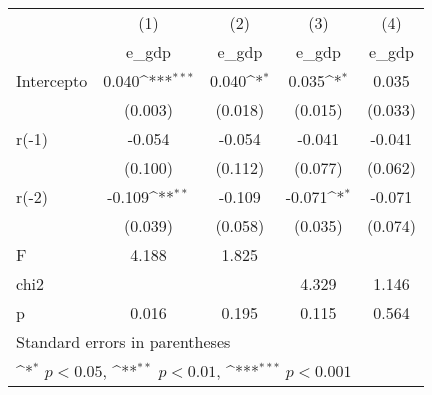 {
\def\sym#1{\ifmmode^{#1}\else\(^{#1}\)\fi}
\begin{longtable}{l*{4}{c}}
\hline\hline\endfirsthead\hline\endhead\hline\endfoot\endlastfoot
            &\multicolumn{1}{c}{(1)}&\multicolumn{1}{c}{(2)}&\multicolumn{1}{c}{(3)}&\multicolumn{1}{c}{(4)}\\
            &\multicolumn{1}{c}{e\_gdp}&\multicolumn{1}{c}{e\_gdp}&\multicolumn{1}{c}{e\_gdp}&\multicolumn{1}{c}{e\_gdp}\\
\hline
Intercepto  &       0.040\sym{***}&       0.040\sym{*}  &       0.035\sym{*}  &       0.035         \\
            &     (0.003)         &     (0.018)         &     (0.015)         &     (0.033)         \\
r(-1)       &      -0.054         &      -0.054         &      -0.041         &      -0.041         \\
            &     (0.100)         &     (0.112)         &     (0.077)         &     (0.062)         \\
r(-2)       &      -0.109\sym{**} &      -0.109         &      -0.071\sym{*}  &      -0.071         \\
            &     (0.039)         &     (0.058)         &     (0.035)         &     (0.074)         \\
\hline
F           &       4.188         &       1.825         &                     &                     \\
chi2        &                     &                     &       4.329         &       1.146         \\
p           &       0.016         &       0.195         &       0.115         &       0.564         \\
\hline\hline
\multicolumn{5}{l}{\footnotesize Standard errors in parentheses}\\
\multicolumn{5}{l}{\footnotesize \sym{*} \(p<0.05\), \sym{**} \(p<0.01\), \sym{***} \(p<0.001\)}\\
\end{longtable}
}
